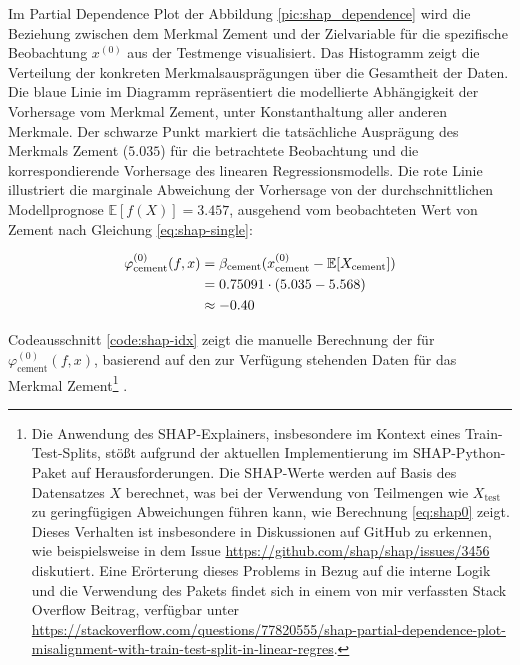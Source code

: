 Im Partial Dependence Plot der Abbildung \ref{pic:shap_dependence} wird die Beziehung zwischen 
dem Merkmal Zement und der Zielvariable für die spezifische Beobachtung $x^{(0)}$ aus der Testmenge visualisiert. 
Das Histogramm zeigt die Verteilung der konkreten Merkmalsausprägungen über die Gesamtheit der Daten.
Die blaue Linie im Diagramm repräsentiert die modellierte Abhängigkeit der Vorhersage vom Merkmal Zement, 
unter Konstanthaltung aller anderen Merkmale. Der schwarze Punkt markiert die tatsächliche Ausprägung des 
Merkmals Zement ($5.035$) für die betrachtete Beobachtung und die korrespondierende Vorhersage 
des linearen Regressionsmodells. Die rote Linie illustriert die marginale Abweichung der Vorhersage 
von der durchschnittlichen Modellprognose $\mathbb{E}[f(X)] = 3.457$, ausgehend vom 
beobachteten Wert von Zement nach Gleichung \ref{eq:shap-single}:

\begin{align}
    \label{eq:shap0}
    \varphi_{\text{cement}}^{(0)}(f, x) &= \beta_{\text{cement}} (x_{\text{cement}}^{(0)} - \mathbb{E}[X_{\text{cement}}]) \\ \notag
                        &= 0.75091 \cdot (5.035 - 5.568) \\ \notag
                        &\approx -0.40
\end{align}

Codeausschnitt \ref{code:shap-idx} zeigt die manuelle Berechnung der für $\varphi_{\text{cement}}^{(0)}(f, x)$, basierend
auf den zur Verfügung stehenden Daten für das Merkmal Zement\footnote{Die Anwendung des SHAP-Explainers, 
insbesondere im Kontext eines Train-Test-Splits, stößt aufgrund der aktuellen Implementierung im SHAP-Python-Paket 
auf Herausforderungen. Die SHAP-Werte werden auf Basis des Datensatzes $X$ berechnet, 
was bei der Verwendung von Teilmengen wie $X_{\text{test}}$ zu geringfügigen Abweichungen führen kann, wie Berechnung \ref{eq:shap0} zeigt.
Dieses Verhalten ist insbesondere in Diskussionen auf GitHub zu erkennen, wie beispielsweise in dem Issue 
\url{https://github.com/shap/shap/issues/3456} diskutiert. Eine Erörterung dieses Problems in Bezug auf die interne Logik und die Verwendung des Pakets
findet sich in einem von mir verfassten Stack Overflow Beitrag, verfügbar unter 
\url{https://stackoverflow.com/questions/77820555/shap-partial-dependence-plot-misalignment-with-train-test-split-in-linear-regres}.}
.



